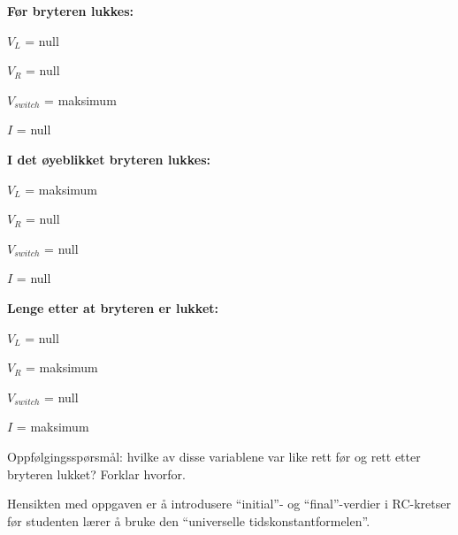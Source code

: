 





\noindent
{\bf Før bryteren lukkes:}

$V_{L}$ = null

$V_{R}$ = null

$V_{switch}$ = maksimum

$I$ = null

\vskip 10pt
\goodbreak

\noindent
{\bf I det øyeblikket bryteren lukkes:}

$V_{L}$ = maksimum

$V_{R}$ = null

$V_{switch}$ = null

$I$ = null

\vskip 10pt
\goodbreak

\noindent
{\bf Lenge etter at bryteren er lukket:}

$V_{L}$ = null

$V_{R}$ = maksimum

$V_{switch}$ = null

$I$ = maksimum

\vskip 10pt

Oppfølgingsspørsmål: hvilke av disse variablene var like rett før og rett etter bryteren lukket? Forklar hvorfor.







Hensikten med oppgaven er å introdusere ``initial''- og ``final''-verdier i RC-kretser før studenten lærer å bruke den ``universelle tidskonstantformelen''.



